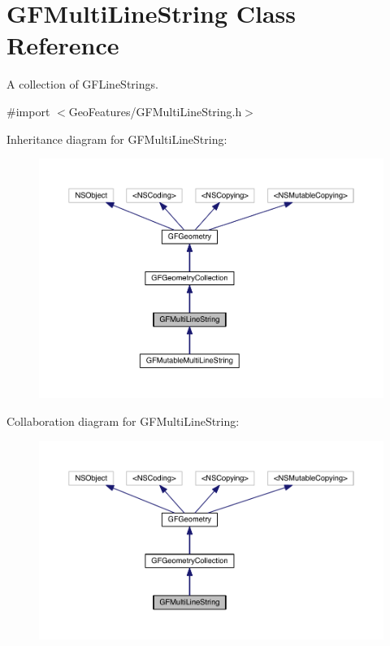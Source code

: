 \hypertarget{interface_g_f_multi_line_string}{}\section{G\+F\+Multi\+Line\+String Class Reference}
\label{interface_g_f_multi_line_string}


A collection of G\+F\+Line\+Strings.  




{\ttfamily \#import $<$Geo\+Features/\+G\+F\+Multi\+Line\+String.\+h$>$}



Inheritance diagram for G\+F\+Multi\+Line\+String\+:\nopagebreak
\begin{figure}[H]
\begin{center}
\leavevmode
\includegraphics[width=350pt]{interface_g_f_multi_line_string__inherit__graph}
\end{center}
\end{figure}


Collaboration diagram for G\+F\+Multi\+Line\+String\+:\nopagebreak
\begin{figure}[H]
\begin{center}
\leavevmode
\includegraphics[width=350pt]{interface_g_f_multi_line_string__coll__graph}
\end{center}
\end{figure}
